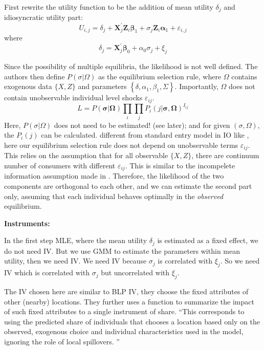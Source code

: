 First rewrite the utility function to be the addition of mean utility $\delta_j$ and idiosyncratic utility part:
\[
    U_{i, j}=\delta_{j}+\mathbf{X}_{j}^{\prime} \mathbf{Z}_{i} \boldsymbol{\beta}_{1}+\sigma_{j} \mathbf{Z}_{i} \boldsymbol{\alpha}_{1}+\varepsilon_{i, j}
\]
where
\[
    \delta_{j}=\mathbf{X}_{j}^{\prime} \boldsymbol{\beta}_{0}+\alpha_{0} \sigma_{j}+\xi_{j}
\]

Since the possibility of multiple equilibria, the likelihood is not well defined. 
The authors then define $P(\sigma | \Omega)$ as the equilibrium selection rule, where $\Omega$ contains exogenous data $\{X,Z\}$ and parameters $\left\{\delta, \alpha_{1}, \beta_{1}, \Sigma\right\}$.
Importantly, $\Omega$ does not contain unobservable individual level shocks $\varepsilon_{ij}$.
\[
    L=P(\boldsymbol{\sigma} | \mathbf{\Omega}) \prod_{i} \prod_{j} P_{i}(j | \boldsymbol{\sigma}, \mathbf{\Omega})^{I_{i j}}
\]
Here, $P(\sigma | \Omega)$ does not need to be estimated! (see later); and for given $(\sigma, \Omega)$, the $P_i(j)$ can be calculated.
 different from standard entry model in IO like \citet{CilibertoTamer2009}, here our equilibrium selection rule does not depend on unobservable terms $\varepsilon_{ij}$.
This relies on the assumption that for all observable $\{X,Z\}$, there are continuum number of consumers with different $\varepsilon_{ij}$.
This is similar to the incompelete information assumption made in \citet{Seim2006}.
Therefore, the likelihood of the two components are orthogonal to each other, and we can estimate the second part only, assuming that each individual behaves optimally in the \textit{observed} equilibrium.

\textbf{Instruments:}


In the first step MLE, where the mean utility $\delta_j$ is estimated as a fixed effect, we do not need IV.
But we use GMM to estimate the parameters within mean utility, then we need IV.
We need IV because $\sigma_j$ is correlated with $\xi_j$. So we need IV which is correlated with $\sigma_j$ but uncorrelated with $\xi_j$.

The IV chosen here are similar to BLP IV, they choose the fixed attributes of other (nearby) locations.
They further uses a function to summarize the impact of such fixed attributes to a single instrument of share.
``This corresponds to using the predicted share of individuals that chooses a location based only on the observed, exogenous choice and individual characteristics used in the model, ignoring the role of local spillovers. ''

